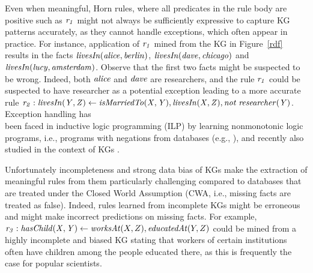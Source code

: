 Even when meaningful, Horn rules, where all predicates in the rule body are positive such as $\mathit{r_1}$ might not always be sufficiently expressive %
to capture KG patterns accurately, as they  cannot handle exceptions, which often appear in practice. 
For instance, application of $\mathit{r_1}$ mined from the KG in Figure~\ref{rdf} results in the facts $\mathit{livesIn(alice,berlin)}$, $\mathit{livesIn(dave,chicago)}$ and $\mathit{livesIn(lucy,amsterdam)}$. Observe that the first two facts might be suspected to be wrong. Indeed, both $\mathit{alice}$ and $\mathit{dave}$ are researchers, and the rule $\mathit{r_1}$ could be suspected to have researcher as a potential exception leading to a more accurate rule $\mathit{r_2:\;}\mathit{livesIn(Y,Z)}\leftarrow \mathit{isMarriedTo(X,Y),livesIn(X,Z), not\;researcher(Y)}$.
Exception handling has \\been faced in inductive logic programming (ILP) by learning nonmonotonic logic programs, i.e., programs with negations from databases (e.g., \cite{DBLP:conf/ijcai/InoueK97,DBLP:journals/tocl/Sakama05,R08}), and recently also studied in the context of KGs \cite{gad2016,rumis}.


Unfortunately incompleteness and strong data bias of KGs make the extraction of meaningful rules from them particularly challenging compared to databases that are treated under the Closed World Assumption (CWA, i.e., missing facts are treated as false). Indeed, rules learned from incomplete KGs might be erroneous and might make incorrect predictions on missing facts. 
For example, $\mathit{r_3}: \mathit{hasChild(X,Y)}\leftarrow \mathit{worksAt}(X,Z),\mathit{educatedAt}(Y,Z)$ could be mined from a highly incomplete and biased KG stating that workers of certain institutions often have children among the people educated there, 
as this is frequently the case for popular scientists.





